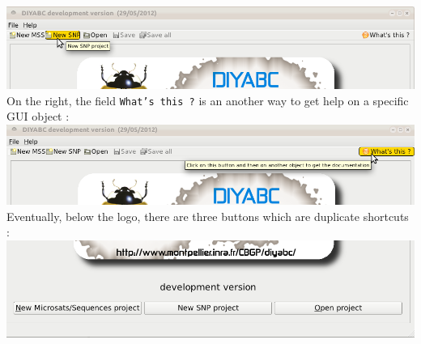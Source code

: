 \includegraphics[scale=0.4]{gui_pictures/Capture-DIYABC-4.png}\\
 
On the right, the field \texttt{What's this ?} is an another way to get help on a specific GUI object :\\
 
\includegraphics[scale=0.4]{gui_pictures/Capture-DIYABC-5.png}\\ 

Eventually, below the logo, there are three buttons which are duplicate shortcuts :\\
 
\includegraphics[scale=0.4]{gui_pictures/Capture-DIYABC-6.png}\\ 


  





